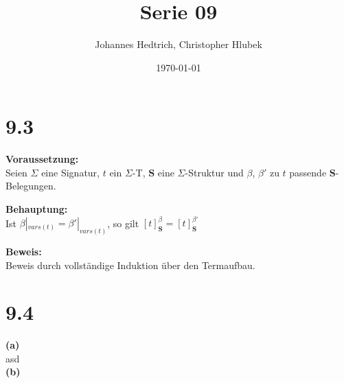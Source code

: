 \documentclass[12pt,a4paper]{scrartcl}
\title{Serie 09}
\author{Johannes Hedtrich, Christopher Hlubek}
\date{\today}
\begin{document}
  \section*{9.3}
  \noindent
  \textbf{Voraussetzung:}\\
  
  Seien $\Sigma$ eine Signatur, $t$ ein $\Sigma$-T, $\textbf{S}$ eine $\Sigma$-Struktur und $\beta$, $\beta'$ zu $t$ passende $\textbf{S}$-Belegungen.

  \noindent
  \textbf{Behauptung:}\\ 
  
  Ist $\beta|_{vars(t)} = \beta'|_{vars(t)}$, so gilt $[t]^{\beta}_{\textbf{S}} = [t]^{\beta'}_{\textbf{S}}$

  \noindent
  \textbf{Beweis:}\\
  
  Beweis durch vollständige Induktion über den Termaufbau.\\
  \section*{9.4}
  \noindent
  \textbf{(a)}\\
  
  asd\\
  \textbf{(b)}\\
\end{document}
